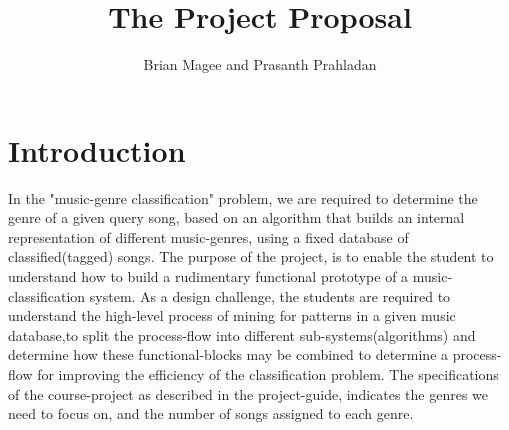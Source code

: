 \documentclass[12pt]{article}
\begin{document}
                                       
\title{The Project Proposal}
\author{Brian Magee and Prasanth Prahladan}
\maketitle

\section{Introduction}
In the "music-genre classification" problem, we are required to determine the genre of a given query song, based on 
an algorithm that builds an internal representation of different music-genres, using a fixed database of classified(tagged) songs. The purpose of the project, is to enable the student to understand how to build a rudimentary functional prototype of a music-classification system. As a design challenge, the students are required to understand the high-level process of mining for patterns in a given music database,to split the process-flow into different sub-systems(algorithms) and determine how these functional-blocks may be combined to determine a process-flow for improving the efficiency of the classification problem. The specifications of the course-project as described in the project-guide, indicates the genres we need to focus on, and the number of songs assigned to each genre. 
\end{document}
